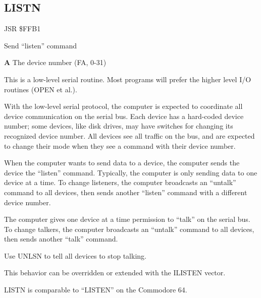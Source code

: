 \subsection{LISTN}
\label{KERNAL Jump Table!LISTN}
\begin{description}[leftmargin=2cm,style=nextline]
    \item [Address:] JSR \$FFB1
    \item [Description:] Send ``listen'' command
    \item [Inputs:]
        \textbf{A} The device number (FA, 0-31)
    \item [Remarks:]
        This is a low-level serial routine. Most programs will prefer the higher level I/O routines (OPEN et al.).

        With the low-level serial protocol, the computer is expected to coordinate all device communication on the serial bus. Each device has a hard-coded device number; some devices, like disk drives, may have switches for changing its recognized device number. All devices see all traffic on the bus, and are expected to change their mode when they see a command with their device number.

        When the computer wants to send data to a device, the computer sends the device the ``listen'' command. Typically, the computer is only sending data to one device at a time. To change listeners, the computer broadcasts an ``untalk'' command to all devices, then sends another ``listen'' command with a different device number.

        The computer gives one device at a time permission to ``talk'' on the serial bus. To change talkers, the computer broadcasts an ``untalk'' command to all devices, then sends another ``talk'' command.

        Use UNLSN to tell all devices to stop talking.

        This behavior can be overridden or extended with the ILISTEN vector.

        LISTN is comparable to ``LISTEN'' on the Commodore 64.

    \item [Example:]
\end{description}




